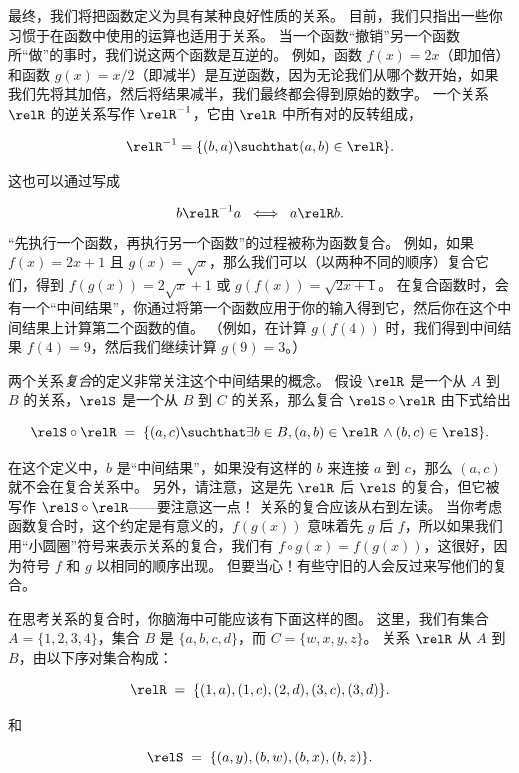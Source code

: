 最终，我们将把函数定义为具有某种良好性质的关系。
目前，我们只指出一些你习惯于在函数中使用的运算也适用于关系。
当一个函数“撤销”另一个函数所“做”的事时，我们说这两个函数是互逆的。
例如，函数 $f(x)=2x$（即加倍）和函数 $g(x)=x/2$（即减半）是互逆函数，因为无论我们从哪个数开始，如果我们先将其加倍，然后将结果减半，我们最终都会得到原始的数字。
一个关系 $\relR$ 的逆关系写作 $\relR^{-1}$，它由 $\relR$ 中所有对的反转组成，

\[ \relR^{-1} = \{ (b,a) \suchthat (a,b) \in \relR \}.
\]

这也可以通过写成

\[ b\relR^{-1}a \; \iff \; a\relR b.
\]
“先执行一个函数，再执行另一个函数”的过程被称为函数复合。
例如，如果 $f(x) = 2x+1$ 且 $g(x) = \sqrt{x}$，那么我们可以（以两种不同的顺序）复合它们，得到 $f(g(x)) = 2\sqrt{x}+1$ 或 $g(f(x)) = \sqrt{2x+1}$。
在复合函数时，会有一个“中间结果”，你通过将第一个函数应用于你的输入得到它，然后你在这个中间结果上计算第二个函数的值。
（例如，在计算 $g(f(4))$ 时，我们得到中间结果 $f(4) = 9$，然后我们继续计算 $g(9) = 3$。）

两个关系\emph{复合}的定义非常关注这个中间结果的概念。
假设 $\relR$ 是一个从 $A$ 到 $B$ 的关系，$\relS$ 是一个从 $B$ 到 $C$ 的关系，那么复合 $\relS \circ \relR$ 由下式给出

\[  \relS \circ \relR \;
= \; \{ (a,c) \suchthat \exists b \in B, (a,b) \in \relR \, \land (b,c) \in \relS \}.
\]

在这个定义中，$b$ 是“中间结果”，如果没有这样的 $b$ 来连接 $a$ 到 $c$，那么 $(a,c)$ 就不会在复合关系中。
另外，请注意，这是先 $\relR$ 后 $\relS$ 的复合，但它被写作 $\relS \circ \relR$——要注意这一点！
关系的复合应该从右到左读。
当你考虑函数复合时，这个约定是有意义的，$f(g(x))$ 意味着先 $g$ 后 $f$，所以如果我们用“小圆圈”符号来表示关系的复合，我们有 $f \circ g (x) = f(g(x))$，这很好，因为符号 $f$ 和 $g$ 以相同的顺序出现。
但要当心！有些守旧的人会反过来写他们的复合。

在思考关系的复合时，你脑海中可能应该有下面这样的图。
这里，我们有集合 $A=\{1,2,3,4\}$，集合 $B$ 是 $\{a,b,c,d\}$，而 $C=\{w,x,y,z\}$。
关系 $\relR$ 从 $A$ 到 $B$，由以下序对集合构成：

\[ \relR \; = \;
\{(1,a), (1,c), (2,d), (3,c), (3,d) \}. \]

和

\[ \relS \; = \; \{(a,y), (b,w), (b,x), (b,z) \}.
\]

\vfill



